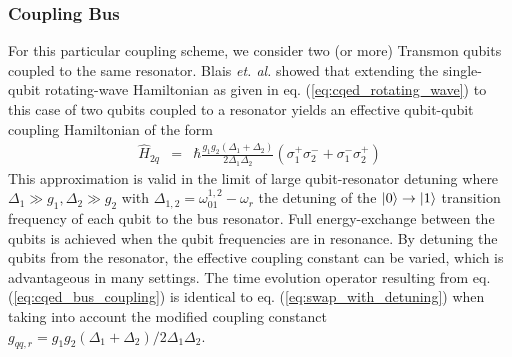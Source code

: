 \subsubsection{Coupling Bus}

For this particular coupling scheme, we consider two (or more) Transmon qubits coupled to the same resonator. Blais {\it et. al.} \citep{blais_quantum-information_2007} showed that extending the single-qubit rotating-wave Hamiltonian as given in eq. (\ref{eq:cqed_rotating_wave}) to this case of two qubits coupled to a resonator yields an effective qubit-qubit coupling Hamiltonian of the form
%
\begin{eqnarray}
\hat{H}_{2q} & = & \hbar\frac{g_1 g_2(\Delta_1+\Delta_2)}{2\Delta_1\Delta_2}(\sigma_1^+\sigma_2^-+\sigma_1^-\sigma_2^+) \label{eq:cqed_bus_coupling}
\end{eqnarray}
%
This approximation is valid in the limit of large qubit-resonator detuning where $\Delta_1 \gg g_1,\Delta_2 \gg g_2$ with $\Delta_{1,2} = \omega_{01}^{1,2}-\omega_r$ the detuning of the $\left| 0 \right>\to\left| 1 \right>$ transition frequency of each qubit to the bus resonator. Full energy-exchange between the qubits is achieved when the qubit frequencies are in resonance. By detuning the qubits from the resonator, the effective coupling constant can be varied, which is advantageous in many settings. The time evolution operator resulting from eq. (\ref{eq:cqed_bus_coupling}) is identical to eq. (\ref{eq:swap_with_detuning}) when taking into account the modified coupling constanct $g_{qq,r}=g_1 g_2(\Delta_1+\Delta_2)/2\Delta_1\Delta_2$.